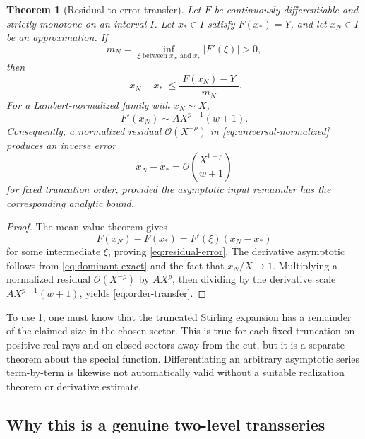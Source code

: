 \documentclass[11pt]{article}
\newtheorem{theorem}{Theorem}[section]
\theoremstyle{definition}
\theoremstyle{remark}
\newcommand{\BigO}{\mathcal O}
\begin{document}
\begin{theorem}[Residual-to-error transfer]\label{thm:residual-error}
Let \(F\) be continuously differentiable and strictly monotone on an interval
\(I\).  Let \(x_*\in I\) satisfy \(F(x_*)=Y\), and let \(x_N\in I\) be an approximation.  If
\[
 m_N=\inf_{\xi\text{ between }x_N\text{ and }x_*}|F'(\xi)|>0,
\]
then
\begin{equation}\label{eq:residual-error}
 |x_N-x_*|\le \frac{|F(x_N)-Y|}{m_N}.
\end{equation}
For a Lambert-normalized family with \(x_N\sim X\),
\[
 F'(x_N)\sim A X^{p-1}(w+1).
\]
Consequently, a normalized residual
\(\BigO(X^{-\rho})\) in \cref{eq:universal-normalized} produces an inverse error
\begin{equation}\label{eq:order-transfer}
 x_N-x_*=\BigO\!\left(\frac{X^{1-\rho}}{w+1}\right)
\end{equation}
for fixed truncation order, provided the asymptotic input remainder has the corresponding analytic bound.
\end{theorem}

\begin{proof}
The mean value theorem gives
\[
 F(x_N)-F(x_*)=F'(\xi)(x_N-x_*)
\]
for some intermediate \(\xi\), proving \cref{eq:residual-error}.  The derivative asymptotic follows from \cref{eq:dominant-exact} and the fact that \(x_N/X\to1\).  Multiplying a normalized residual \(\BigO(X^{-\rho})\) by \(AX^p\), then dividing by the derivative scale \(AX^{p-1}(w+1)\), yields \cref{eq:order-transfer}.
\end{proof}

\begin{warningbox}
To use \cref{thm:residual-error}, one must know that the truncated Stirling expansion has a remainder of the claimed size in the chosen sector.  This is true for each fixed truncation on positive real rays and on closed sectors away from the cut, but it is a separate theorem about the special function.  Differentiating an arbitrary asymptotic series term-by-term is likewise not automatically valid without a suitable realization theorem or derivative estimate.
\end{warningbox}

\subsection{Why this is a genuine two-level transseries}
\end{document}
